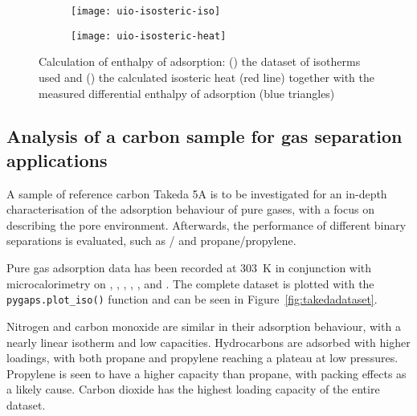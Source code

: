 \begin{figure}[ht]

    \centering
    \begin{subfigure}[b]{.5\textwidth}
        \centering
        \texttt{[image: uio-isosteric-iso]}
        \caption{}%
        \label{fig:uioisostericiso}
    \end{subfigure}%
    \begin{subfigure}[b]{.5\textwidth}
        \centering
        \texttt{[image: uio-isosteric-heat]}
        \caption{}%
        \label{fig:uioisostericheat}
    \end{subfigure}
    \caption{Calculation of enthalpy of adsorption: (\protect{}) 
    the dataset of isotherms used and (\protect{}) the calculated
    isosteric heat (red line) together with the measured differential enthalpy of adsorption 
    (blue triangles)}%
    \label{fig:uioisosteric}

\end{figure}

\subsection{Analysis of a carbon sample for gas separation applications}

A sample of reference carbon Takeda 5A is to be investigated for an in-depth characterisation of
the adsorption behaviour of pure gases, with a focus on describing the pore environment.
Afterwards, the performance of different binary separations is evaluated, 
such as / and propane/propylene.

Pure gas adsorption data has been recorded at \SI{303}{\kelvin} in conjunction with
microcalorimetry on , , , , ,
 and . The complete dataset is plotted with the 
\lstinline{pygaps.plot_iso()} function and can be seen in Figure~\ref{fig:takedadataset}.

Nitrogen and carbon monoxide are similar in their adsorption behaviour,
with a nearly linear isotherm and low capacities.
Hydrocarbons are adsorbed with higher loadings, with both propane and propylene 
reaching a plateau at low pressures. Propylene is seen to have a 
higher capacity than propane, with packing effects as a likely cause.
Carbon dioxide has the highest loading capacity of the entire dataset.

